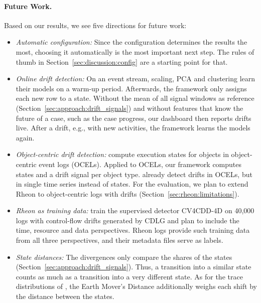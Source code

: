 \paragraph{Future Work.}
Based on our results, we see five directions for future work:
\begin{itemize}
	\item \emph{Automatic configuration:} Since the configuration determines the results the most, choosing it automatically is the most important next step. The rules of thumb in Section~\ref{sec:discussion:config} are a starting point for that.
	\item \emph{Online drift detection:} On an event stream, scaling, PCA and clustering learn their models on a warm-up period. Afterwards, the framework only assigns each new row to a state. Without the mean of all signal windows as reference (Section~\ref{sec:approach:drift_signals}) and without features that know the future of a case, such as the case progress, our dashboard then reports drifts live. After a drift, e.g., with new activities, the framework learns the models again.
	\item \emph{Object-centric drift detection:} \textcite{berti2025ocel} compute execution states for objects in object-centric event logs (OCELs). Applied to OCELs, our framework computes states and a drift signal per object type. \textcite{adams2023explainable} already detect drifts in OCELs, but in single time series instead of states. For the evaluation, we plan to extend Rheon to object-centric logs with drifts (Section~\ref{sec:rheon:limitations}).
	\item \emph{Rheon as training data:} \textcite{kraus2025machine} train the supervised detector CV4CDD-4D on 40,000 logs with control-flow drifts generated by CDLG and plan to include the time, resource and data perspectives. Rheon logs provide such training data from all three perspectives, and their metadata files serve as labels.
	\item \emph{State distances:} The divergences only compare the shares of the states (Section~\ref{sec:approach:drift_signals}). Thus, a transition into a similar state counts as much as a transition into a very different state. As for the trace distributions of \textcite{brockhoff2020time}, the Earth Mover's Distance additionally weighs each shift by the distance between the states.
\end{itemize}
